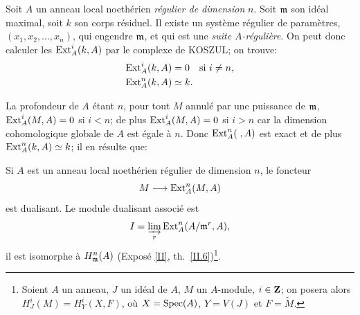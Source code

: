 \begin{exemple} \label{IV.5.3}
Soit $A$ un anneau local noeth\'erien \emph{régulier de dimension} $n$. Soit $\mathfrak{m}$ son id\'eal maximal, soit $k$ son corps r\'esiduel. Il existe un syst\`eme r\'egulier de param\`etres, $(x_{1}, x_{2}, \ldots, x_{n})$, qui engendre $\mathfrak{m}$, et qui est une \emph{suite $A$-régulière}. On peut donc calculer les $\operatorname{Ext}^{i}_{A}(k, A)$ par le complexe de KOSZUL; on trouve:
\begin{align*}
\operatorname{Ext}^{i}_{A}(k, A)&=0\quad \text{si } i\neq n,\\
\operatorname{Ext}^{n}_{A}(k, A)&\simeq k.
\end{align*}

La profondeur de $A$ \'etant $n$, pour tout $M$ annul\'e par une puissance de $\mathfrak{m}$, $\operatorname{Ext}^{i}_{A}(M, A)=0$ si $i<n$; de plus $\operatorname{Ext}^{i}_{A}(M, A)=0$ si $i>n$ car la dimension cohomologique globale de $A$ est \'egale \`a $n$. Donc $\operatorname{Ext}^{n}_{A}(\;, A)$ est exact et de plus $\operatorname{Ext}^{n}_{A}(k, A)\simeq k$; il en r\'esulte que:
\end{exemple}

\begin{proposition} \label{IV.5.4}
Si $A$ est un anneau local noeth\'erien r\'egulier de dimension $n$, le foncteur
$$
M\to \Ext_{A}^{n}(M, A)
$$
est dualisant. Le module dualisant associ\'e est
$$
I=\varinjlim_{r}\operatorname{Ext}_{A}^{n}(A/\mathfrak{m}^{r}, A),
$$
il est isomorphe \`a $H^{n}_{\mathfrak{m}}(A)$ (Expos\'e \ref{II}, th.\, \ref{II.6})\footnote{Soient $A$ un anneau, $J$ un id\'eal de $A$, $M$ un $A$-module, $i\in \mathbf{Z}$; on posera alors $H^{i}_{J}(M)=H^{i}_{Y}(X, F)$, o\`u $X={\operatorname{Spec}}(A)$, $Y=V(J)$ et $F=\tilde{M}$.}.
\end{proposition}

